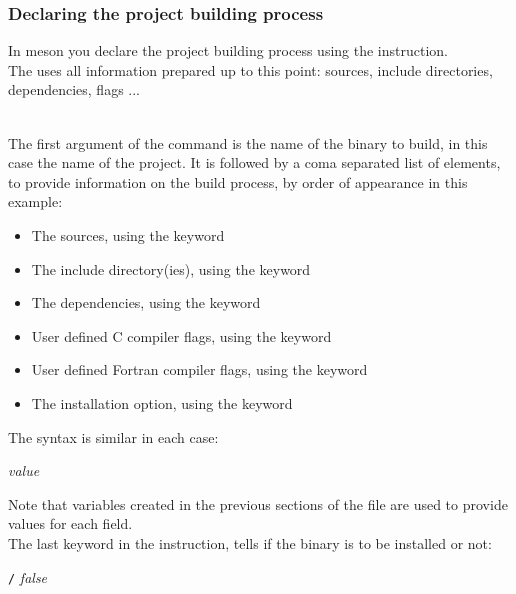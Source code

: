 \subsubsection*{Declaring the project building process}
\label{build_rules_meson}

In meson you declare the project building process using the  instruction. \\
The  uses all information prepared up to this point: sources, include directories, dependencies, flags ... 
\begin{script}
\end{script}
\\[-0.5cm]
\noindent The first argument of the command is the name of the binary to build, in this case the name of the project.  
It is followed by a coma separated list of elements, to provide information on the build process, by order of appearance in this example:
\begin{itemize}
\item The sources, using the keyword 
\item The include directory(ies), using the keyword  
\item The dependencies, using the keyword 
\item User defined C compiler flags, using the keyword 
\item User defined Fortran compiler flags, using the keyword 
\item The installation option, using the keyword 
\end{itemize}
The syntax is similar in each case:
\begin{center}\em{value}\end{center}
\noindent Note that variables created in the previous sections of the file  are used to provide values for each field.  \\
The last keyword in the  instruction, tells if the binary is to be installed or not:
\begin{center} \texttt{/} {\em{false}}\end{center}

